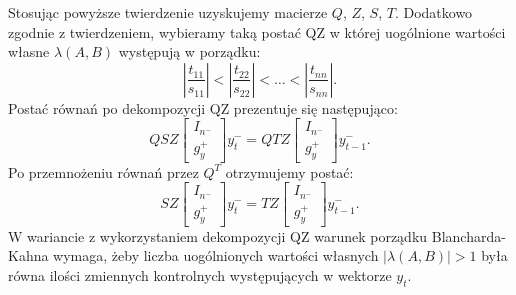 Stosując powyższe twierdzenie uzyskujemy macierze $Q$, $Z$, $S$, $T$. Dodatkowo zgodnie z twierdzeniem, wybieramy taką postać QZ w której uogólnione wartości własne $\lambda(A,B)$ występują w porządku:
\begin{equation}
    \left|\frac{t_{11}}{s_{11}}\right| < |\frac{t_{22}}{s_{22}}| < \dots < |\frac{t_{nn}}{s_{nn}}|.
\end{equation}
Postać równań po dekompozycji QZ prezentuje się następująco:
\begin{equation}
    \label{eqn:qzMainEq}
    Q S Z
    \begin{bmatrix}
        I_{n^-} \\
        g_y^+
    \end{bmatrix}  y_t^- = 
    Q T Z
    \begin{bmatrix}
        I_{n^-} \\
        g_y^+
    \end{bmatrix} y^-_{t-1}.
\end{equation}
Po przemnożeniu równań przez $Q^T$ otrzymujemy postać:
\begin{equation}
    S Z
    \begin{bmatrix}
        I_{n^-} \\
        g_y^+
    \end{bmatrix}  y_t^- = 
    T Z
    \begin{bmatrix}
        I_{n^-} \\
        g_y^+
    \end{bmatrix} y^-_{t-1}.
\end{equation}
W wariancie z wykorzystaniem dekompozycji QZ warunek porządku Blancharda-Kahna wymaga, żeby liczba uogólnionych wartości własnych $|\lambda(A,B)| > 1$ była równa ilości zmiennych kontrolnych występujących w wektorze $y_t$.


